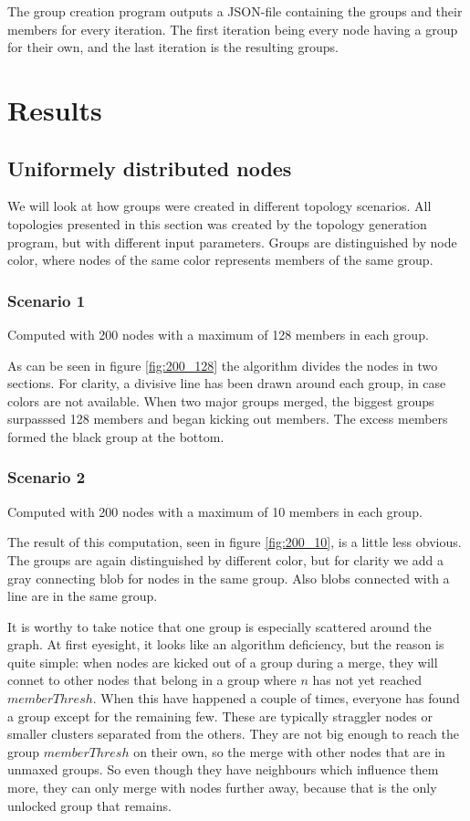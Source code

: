 \documentclass[a4paper,UKenglish]{report}
\begin{document}
The group creation program outputs a JSON-file containing the groups and their members for every iteration. The first iteration being every node having a group for their own,
and the last iteration is the resulting groups.
\section{Results}
\subsection{Uniformely distributed nodes}
We will look at how groups were created in different topology scenarios. 
All topologies presented in this section was created by the topology generation program,
but with different input parameters. Groups are distinguished by node color, where nodes
of the same color represents members of the same group. 
\subsubsection{Scenario 1}
Computed with 200 nodes with a maximum of 128 members in each group.

As can be seen in figure \ref{fig:200_128} the algorithm divides the nodes in two
sections. For clarity, a divisive line has been drawn around each group,
in case colors are not available.
When two major groups merged, the biggest groups surpasssed 128 members and began
kicking out members. The excess members formed the black group at the bottom. 

\subsubsection{Scenario 2}
Computed with 200 nodes with a maximum of 10 members in each group.

The result of this computation, seen in figure \ref{fig:200_10}, is a little less obvious.
The groups are again distinguished by different color, but for clarity we add a gray connecting
blob for nodes in the same group. Also blobs connected with a line are in the same group. 

It is worthy to take notice that one group is especially scattered around the graph.
At first eyesight, it looks like an algorithm deficiency, but the reason is quite simple:
when nodes are kicked out of a group during a merge, they will connet to other nodes
that belong in a group where $n$ has not yet reached $memberThresh$. When this have happened a couple of times, everyone has found a group except for the remaining few.
These are typically straggler nodes or smaller clusters separated from the others.
They are not big enough to reach the group $memberThresh$ on their own, so the merge with other
nodes that are in unmaxed groups. So even though they have neighbours which influence them more,
they can only merge with nodes further away, because that is the only unlocked group that remains.
\end{document}
